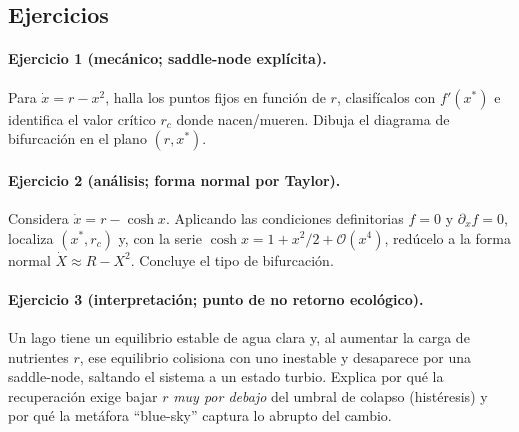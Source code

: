 \subsection{Ejercicios}

\paragraph{Ejercicio 1 (mecánico; saddle-node explícita).} Para $\dot{x} = r - x^2$, halla los puntos fijos en función de $r$, clasifícalos con $f'(x^*)$ e identifica el valor crítico $r_c$ donde nacen/mueren. Dibuja el diagrama de bifurcación en el plano $(r,x^*)$.

\paragraph{Ejercicio 2 (análisis; forma normal por Taylor).} Considera $\dot{x} = r - \cosh x$. Aplicando las condiciones definitorias $f=0$ y $\partial_x f=0$, localiza $(x^*,r_c)$ y, con la serie $\cosh x = 1 + x^2/2 + \mathcal{O}(x^4)$, redúcelo a la forma normal $\dot{X}\approx R - X^2$. Concluye el tipo de bifurcación.

\paragraph{Ejercicio 3 (interpretación; punto de no retorno ecológico).} Un lago tiene un equilibrio estable de agua clara y, al aumentar la carga de nutrientes $r$, ese equilibrio colisiona con uno inestable y desaparece por una saddle-node, saltando el sistema a un estado turbio. Explica por qué la recuperación exige bajar $r$ \emph{muy por debajo} del umbral de colapso (histéresis) y por qué la metáfora ``blue-sky'' captura lo abrupto del cambio.

